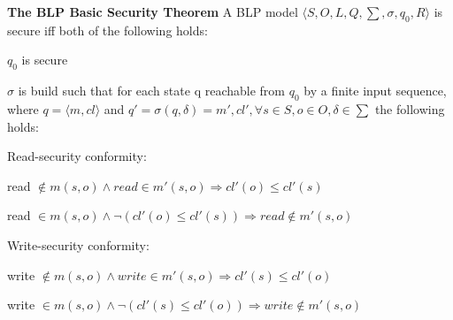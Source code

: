 \documentclass[a4paper]{article}
\renewcommand{\note}[2]{\begin{noteBox} \textbf{#1} #2 \end{noteBox}}
\begin{document}
\begin{multicols}{3}
    \note{The BLP Basic Security Theorem}{A BLP model $\langle S,O,L,Q,\sum,\sigma,q_0,R\rangle$ is secure iff both of the following holds:
        \begin{enumerate*}
            \item $q_0$ is secure
            \item $\sigma$ is build such that for each state q reachable from $q_0$ by a finite input sequence, where $q=\langle m,cl\rangle$ and $q'=\sigma(q,\delta)=m',cl',\forall s\in S, o\in O,\delta\in\sum$ the following holds:
        \end{enumerate*}
        \begin{itemize*}
            \item Read-security conformity:
            \begin{itemize*}
                \item read $\not\in m(s,o)\wedge read\in m'(s,o)\Rightarrow cl'(o)\leq cl'(s)$
                \item read $\in m(s,o) \wedge\lnot (cl'(o)\leq cl'(s)) \Rightarrow read \not\in m'(s,o)$
            \end{itemize*}
            \item Write-security conformity:
            \begin{itemize*}
                \item write $\not\in m(s,o)\wedge write \in m'(s,o)\Rightarrow cl'(s)\leq cl'(o)$
                \item write $\in m(s,o)\wedge\lnot(cl'(s)\leq cl'(o)) \Rightarrow write \not\in m'(s,o)$
            \end{itemize*}
        \end{itemize*}
    }


\end{multicols}
\end{document}
